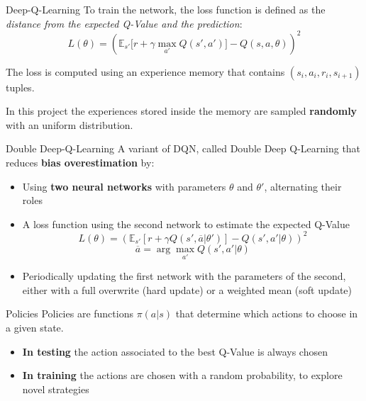 \documentclass[10pt, xcolor={dvipsnames}]{beamer}
\begin{document}
\begin{frame}{Deep-Q-Learning}
To train the network, the \alert{loss} function is defined as the \textit{distance from the expected Q-Value and the prediction}:
\[L(\theta) = (\mathbb{E}_{s'}[r + \gamma \max_{a'}{Q(s',a')]} - Q(s,a,\theta))^2 \]

The loss is computed using an \alert{experience memory} that contains $(s_i, a_i, r_i, s_{i+1})$ tuples. 

In this project the experiences stored inside the memory are sampled \textbf{randomly} with an uniform distribution.
\end{frame}

\begin{frame}{Double Deep-Q-Learning}
    A variant of DQN, called \alert{Double Deep Q-Learning} that reduces \textbf{bias overestimation} by:
    \begin{itemize}
        \item Using \textbf{two neural networks} with parameters $\theta$ and $\theta'$, alternating their roles
        \item A loss function using the second network to estimate the expected Q-Value
        \[L(\theta) = (\mathbb{E}_{s'}[r + \gamma Q(s', \overline{a} | \theta')] - Q(s', a' |\theta))^2\]
        \[\overline{a} = \arg\max_{a'}{Q(s',a' | \theta)}\]
        \item Periodically updating the first network with the parameters of the second, either with a full overwrite (hard update) or a weighted mean (soft update)
    \end{itemize}
\end{frame}



\begin{frame}{Policies}
    \alert{Policies} are functions $\pi(a | s)$ that determine which actions to choose in a given state.
    \begin{itemize}
        \item \textbf{In testing} the action associated to the best Q-Value is always chosen
        \item \textbf{In training} the actions are chosen with a random probability, to explore novel strategies
    \end{itemize}
\end{frame}
\end{document}
